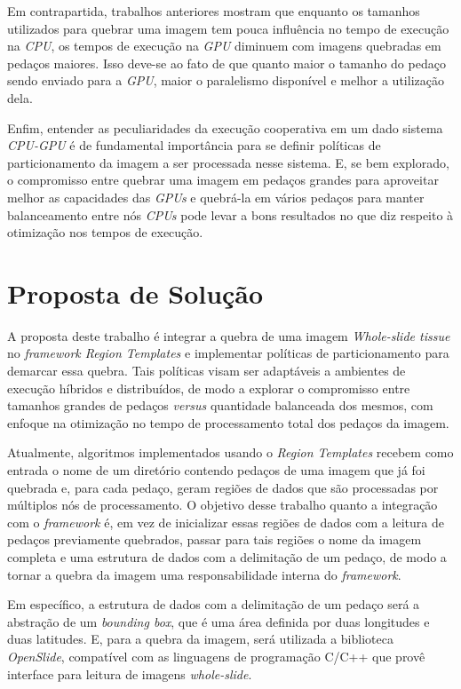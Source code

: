 Em contrapartida, trabalhos anteriores\cite{kurc_qi_wang_wang_teodoro_2015} mostram que
enquanto os tamanhos utilizados para quebrar uma imagem tem pouca influência no tempo de execução na \textit{CPU}, os tempos de execução na \textit{GPU} diminuem com imagens quebradas em pedaços maiores. Isso deve-se ao fato de que quanto maior o tamanho do pedaço sendo enviado para a \textit{GPU}, maior o paralelismo disponível e melhor a utilização dela.

Enfim, entender as peculiaridades da execução cooperativa em um dado sistema \textit{CPU-GPU}\cite{teodoro_kurc_pan_cooper_kong_widener_saltz_2012} é de fundamental importância para se definir políticas de particionamento da imagem a ser processada nesse sistema. E, se bem explorado, o compromisso entre quebrar uma imagem em pedaços grandes para aproveitar melhor as capacidades das \textit{GPUs} e quebrá-la em vários pedaços para manter balanceamento entre nós \textit{CPUs} pode levar a bons resultados no que diz respeito à otimização nos tempos de execução.

\pagebreak
\section{Proposta de Solução}

A proposta deste trabalho é integrar a quebra de uma imagem \textit{Whole-slide tissue} no \textit{framework Region Templates} e implementar políticas de particionamento para demarcar essa quebra. Tais políticas visam ser adaptáveis a ambientes de execução híbridos e distribuídos, de modo a explorar o compromisso entre tamanhos grandes de pedaços \textit{versus} quantidade balanceada dos mesmos, com enfoque na otimização no tempo de processamento total dos pedaços da imagem.

Atualmente, algoritmos implementados usando o \textit{Region Templates} recebem como entrada o nome de um diretório contendo pedaços de uma imagem que já foi quebrada e, para cada pedaço, geram regiões de dados que são processadas por múltiplos nós de processamento. O objetivo desse trabalho quanto a integração com o \textit{framework} é, em vez de inicializar essas regiões de dados com a leitura de pedaços previamente quebrados, passar para tais regiões o nome da imagem completa e uma estrutura de dados com a delimitação de um pedaço, de modo a tornar a quebra da imagem uma responsabilidade interna do \textit{framework}.

Em específico, a estrutura de dados com a delimitação de um pedaço será a abstração de um \textit{bounding box}, que é uma área definida por duas longitudes e duas latitudes. E, para a quebra da imagem, será utilizada a biblioteca \textit{OpenSlide}\cite{openslide}, compatível com as linguagens de programação C/C++ que provê interface para leitura de imagens \textit{whole-slide}.

